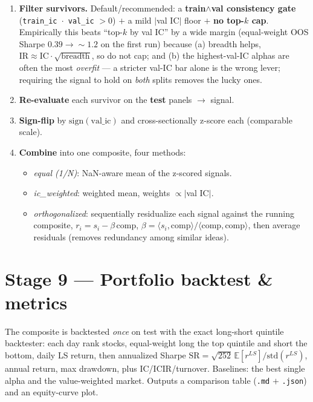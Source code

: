 \documentclass[11pt]{article}
\newcommand{\code}[1]{\texttt{#1}}
\begin{document}
\begin{enumerate}[leftmargin=*]
  \item \textbf{Filter survivors.} Default/recommended: a \textbf{train$\wedge$val
  consistency gate} (\code{train\_ic $\cdot$ val\_ic} $> 0$) $+$ a mild $|$val IC$|$
  floor $+$ \textbf{no top-$k$ cap}. Empirically this beats ``top-$k$ by val IC''
  by a wide margin (equal-weight OOS Sharpe $0.39 \to \sim 1.2$ on the first run)
  because (a) breadth helps, $\mathrm{IR}\approx \mathrm{IC}\cdot\sqrt{\text{breadth}}$,
  so do not cap; and (b) the highest-val-IC alphas are often the most \emph{overfit}
  --- a stricter val-IC bar alone is the wrong lever; requiring the signal to hold on
  \emph{both} splits removes the lucky ones.
  \item \textbf{Re-evaluate} each survivor on the \textbf{test} panels $\to$ signal.
  \item \textbf{Sign-flip} by $\mathrm{sign}(\text{val\_ic})$ and cross-sectionally
  z-score each (comparable scale).
  \item \textbf{Combine} into one composite, four methods:
  \begin{itemize}
    \item \emph{equal (1/N)}: NaN-aware mean of the z-scored signals.
    \item \emph{ic\_weighted}: weighted mean, weights $\propto |$val IC$|$.
    \item \emph{orthogonalized}: sequentially residualize each signal against the
    running composite, $r_i = s_i - \beta\,\mathrm{comp}$,
    $\beta = \langle s_i,\mathrm{comp}\rangle / \langle \mathrm{comp},\mathrm{comp}\rangle$,
    then average residuals (removes redundancy among similar ideas).
  \end{itemize}
\end{enumerate}

\section{Stage 9 --- Portfolio backtest \& metrics}

The composite is backtested \emph{once} on test with the exact long-short quintile
backtester: each day rank stocks, equal-weight long the top quintile and short the
bottom, daily LS return, then annualized Sharpe
$\mathrm{SR}=\sqrt{252}\,\mathbb{E}[r^{LS}]/\mathrm{std}(r^{LS})$, annual return, max
drawdown, plus IC/ICIR/turnover. Baselines: the best single alpha and the
value-weighted market. Outputs a comparison table (\code{.md} $+$ \code{.json}) and an
equity-curve plot.
\end{document}
